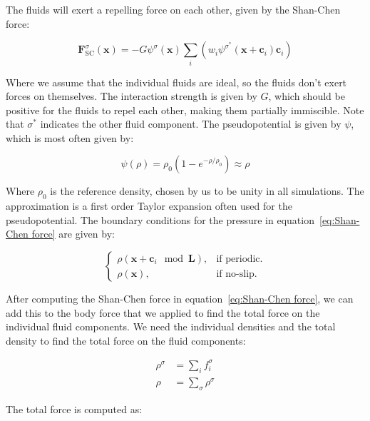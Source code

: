 The fluids will exert a repelling force on each other, given by the Shan-Chen force:

\begin{equation}\label{eq:Shan-Chen force}
    \bm{F}^{\sigma}_{\text{SC}}(\bm{x}) = -G \psi^{\sigma}(\bm{x}) \sum_i \left(w_i \psi^{\sigma^\ast}(\bm{x} + \bm{c}_i) \bm{c}_i \right) 
\end{equation}

Where we assume that the individual fluids are ideal, so the fluids don't exert forces on themselves. The interaction strength is given by $G$, which should be positive for the fluids to repel each other, making them partially immiscible. Note that $\sigma^\ast$ indicates the other fluid component. The pseudopotential is given by $\psi$, which is most often given by:

\begin{equation}\label{eq:Pseudopotential}
    \psi(\rho) = \rho_0 \left(1 - e^{-\rho/\rho_0}\right) \approx \rho
\end{equation}

Where $\rho_0$ is the reference density, chosen by us to be unity in all simulations. The approximation is a first order Taylor expansion often used for the pseudopotential. The boundary conditions for the pressure in equation~\ref{eq:Shan-Chen force} are given by:

\begin{equation}
\begin{cases}
    \rho(\bm{x} + \bm{c}_i \mod\bm{L}), & \text{if periodic.}\\
    \rho(\bm{x}), & \text{if no-slip.}
\end{cases}
\end{equation}

After computing the Shan-Chen force in equation~\ref{eq:Shan-Chen force}, we can add this to the body force that we applied to find the total force on the individual fluid components. We need the individual densities and the total density to find the total force on the fluid components:

\begin{equation}\label{eq:Multicomponent densities}
\begin{split}
    \rho^\sigma &= \sum_i f_i^\sigma\\
    \rho &= \sum_\sigma \rho^\sigma
\end{split}
\end{equation}

The total force is computed as:


